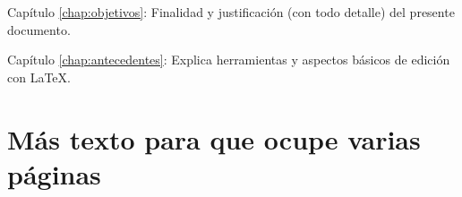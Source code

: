 \begin{definitionlist}
\item[Capítulo \ref{chap:objetivos}: \nameref{chap:objetivos}] Finalidad y
  justificación (con todo detalle) del presente documento.
\item[Capítulo \ref{chap:antecedentes}: \nameref{chap:antecedentes}] Explica
  herramientas y aspectos básicos de edición con \LaTeX.
\end{definitionlist}


\section{Más texto para que ocupe varias páginas}

\blindtext
\blinditemize[4]
\blindmathpaper


